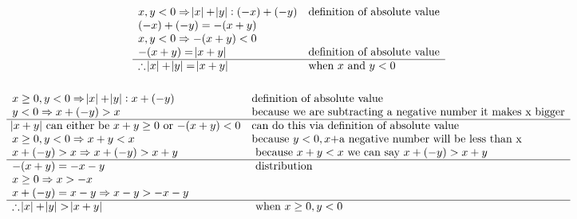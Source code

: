\documentclass[letterpaper]{article}
\begin{document}
        \subsubsection{}
        	\begin{displaymath}
        		\begin{array}{ll}
        			x, y < 0 \Rightarrow \abs{x} + \abs{y}: (-x) + (-y) & $definition of absolute value$\\
                    (-x) + (-y) = -(x + y) &\\
                    x, y < 0 \Rightarrow -(x + y) < 0 &\\ 
                    -(x + y) = \abs{x + y} & $definition of absolute value$\\
                    \hline
                    \therefore \abs{x} + \abs{y} = \abs{x + y} & $when $ x $ and $ y < 0\\
        		\end{array}
        	\end{displaymath}
        \subsubsection{}
        	\begin{displaymath}
        		\begin{array}{ll}
                	x \geq 0, y < 0 \Rightarrow \abs{x} + \abs{y}: x + (-y) & $definition of absolute value$\\
                	y < 0 \Rightarrow x + (-y) > x & $because we are subtracting a negative number it makes x bigger$\\
                    \hline
                	\abs{x + y} $ can either be $ x + y \geq 0 $ or $ -(x + y) < 0 & $can do this via definition of absolute value$\\
                    x \geq 0, y < 0 \Rightarrow x + y < x & $because $y < 0, x + $a negative number will be less than x$\\
                    x + (-y) > x\Rightarrow x +(-y) > x + y & $ because $x + y < x $ we can say $x +(-y) > x + y \\
                    \hline
                    -(x + y) = -x - y & $ distribution$\\
                    x \geq 0 \Rightarrow x > -x & \\
                    x + (-y) = x - y \Rightarrow x - y > -x - y & \\
                    \hline
                    \therefore \abs{x} + \abs{y} > \abs{x + y} & $ when $ x \geq 0, y < 0\\
                \end{array} 
        	\end{displaymath}
\end{document}
